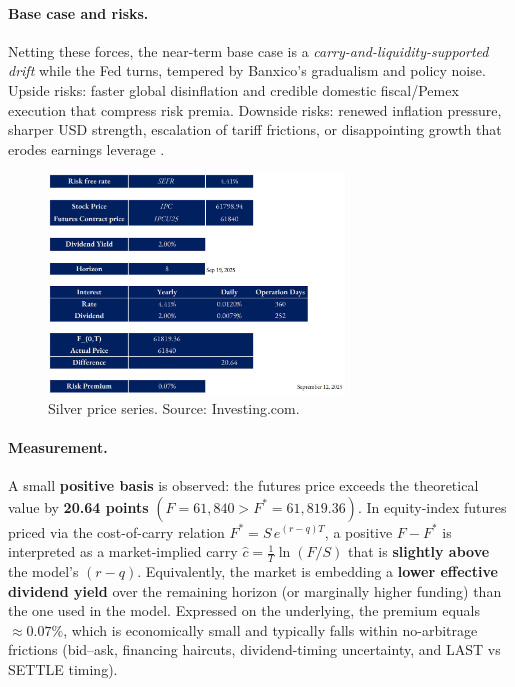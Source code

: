 \documentclass[11pt,a4paper]{article} %
\begin{document}
\paragraph{Base case and risks.}
Netting these forces, the near-term base case is a \emph{carry-and-liquidity-supported drift} while the Fed turns, tempered by Banxico’s gradualism and policy noise. Upside risks: faster global disinflation and credible domestic fiscal/Pemex execution that compress risk premia. Downside risks: renewed inflation pressure, sharper USD strength, escalation of tariff frictions, or disappointing growth that erodes earnings leverage \citep{reuters_ipc_record_2025,bloomberg_mx_inflation_2025,reuters_budget_2025,reuters_pemex_plan_2025,reuters_tariffs_china_autos_2025}.

\begin{figure}[h]
\centering
\includegraphics[width=0.7\textwidth]{figures/ipc.png}
\caption{Silver price series. Source: Investing.com.}
\end{figure}

\paragraph{Measurement.} A small \textbf{positive basis} is observed: the futures price exceeds the theoretical value by \textbf{20.64 points} $(F=61{,}840 > F^{*}=61{,}819.36)$. In equity-index futures priced via the cost-of-carry relation $F^{*}=S\,e^{(r-q)T}$, a positive $F-F^{*}$ is interpreted as a market-implied carry $\hat{c} = \tfrac{1}{T}\ln(F/S)$ that is \textbf{slightly above} the model’s $(r-q)$. Equivalently, the market is embedding a \textbf{lower effective dividend yield} over the remaining horizon (or marginally higher funding) than the one used in the model. Expressed on the underlying, the premium equals \textbf{$\approx 0.07\%$}, which is economically small and typically falls within no-arbitrage frictions (bid–ask, financing haircuts, dividend-timing uncertainty, and LAST vs SETTLE timing).
\end{document}
